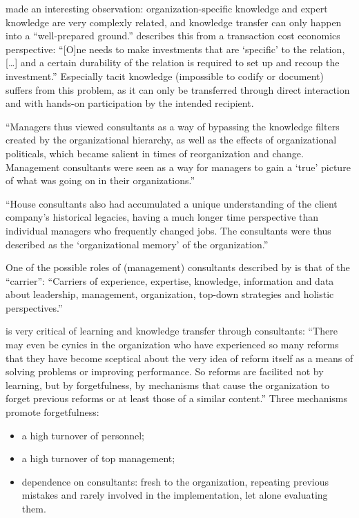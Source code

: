 \documentclass[12pt]{article}
\begin{document}
\citet[84]{fincham2002} made an interesting observation:
organization-specific knowledge and expert knowledge are very complexly
related, and knowledge transfer can only happen into a ``well-prepared
ground.'' \citet[922]{nooteboom2000} describes this from a transaction
cost economics perspective: ``{[}O{]}ne needs to make investments that
are `specific' to the relation, {[}\ldots{]} and a certain durability of
the relation is required to set up and recoup the investment.''
Especially tacit knowledge (impossible to codify or document) suffers
from this problem, as it can only be transferred through direct
interaction and with hands-on participation by the intended recipient.

``Managers thus viewed consultants as a way of bypassing the knowledge
filters created by the organizational hierarchy, as well as the effects
of organizational politicals, which became salient in times of
reorganization and change. Management consultants were seen as a way for
managers to gain a `true' picture of what was going on in their
organizations.'' \citep[ 54]{werr2002}

``House consultants also had accumulated a unique understanding of the
client company's historical legacies, having a much longer time
perspective than individual managers who frequently changed jobs. The
consultants were thus described as the `organizational memory' of the
organization.''

One of the possible roles of (management) consultants described by
\citet[269]{furusten2009} is that of the ``carrier'': ``Carriers of
experience, expertise, knowledge, information and data about leadership,
management, organization, top-down strategies and holistic
perspectives.''

\citet[41-42]{brunson1993} is very critical of learning and knowledge
transfer through consultants: ``There may even be cynics in the
organization who have experienced so many reforms that they have become
sceptical about the very idea of reform itself as a means of solving
problems or improving performance. So reforms are facilited not by
learning, but by forgetfulness, by mechanisms that cause the
organization to forget previous reforms or at least those of a similar
content.'' Three mechanisms promote forgetfulness:

\begin{itemize}
\item
  a high turnover of personnel;
\item
  a high turnover of top management;
\item
  dependence on consultants: fresh to the organization, repeating
  previous mistakes and rarely involved in the implementation, let alone
  evaluating them.
\end{itemize}
\end{document}
